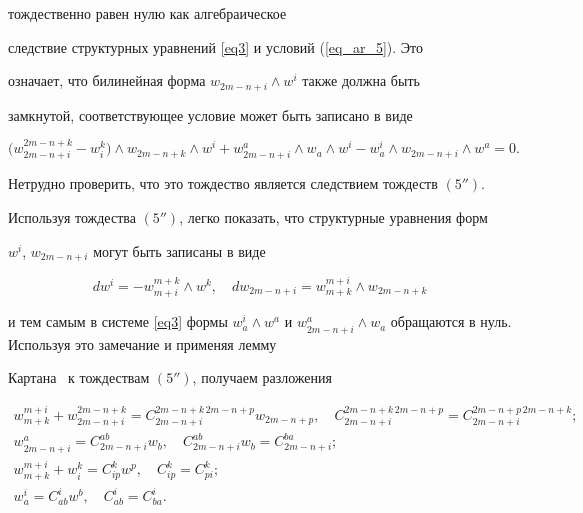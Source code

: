 тождественно равен нулю как алгебраическое


следствие структурных уравнений \eqref{eq3} и условий (\ref{eq_ar_5}). Это


означает, что билинейная форма $w_{2m-n+i}\wedge w^i$ также должна быть


замкнутой, соответствующее условие может быть записано в виде


$$


\big(w^{2m-n+k}_{2m-n+i}-w^k_i\big)\wedge w_{2m-n+k}\wedge w^i


+w^a_{2m-n+i}\wedge w_a\wedge w^i -w^i_a\wedge w_{2m-n+i} \wedge w^a=0.


$$


Нетрудно проверить, что это тождество является следствием тождеств $(5'')$.





Используя тождества $(5'')$, легко показать, что структурные уравнения форм


$w^i$, $w_{2m-n+i}$ могут быть записаны в виде


$$


dw^i=-w^{m+k}_{m+i}\wedge w^k,\quad dw_{2m-n+i}=w^{m+i}_{m+k} \wedge


w_{2m-n+k}


$$


и тем самым в системе \eqref{eq3} формы $w^i_a\wedge w^a$ и $w^a_{2m-n+i} \wedge


w_a$ обращаются в нуль. Используя это замечание и применяя лемму


Картана~\cite{ar5} к тождествам $(5'')$, получаем разложения


\begin{equation}


\label{eq_ar_7}


\begin{array}{c}


w^{m+i}_{m+k}+w^{2m-n+k}_{2m-n+i}=C^{2m-n+k\, 2m-n+p}_{2m-


n+i}w_{2m-n+p},\quad C^{2m-n+k\, 2m-n+p}_{2m-n+i}=C^{2m-n+p\, 2m-n+k}_{2m-


n+i};\\[2mm]


w^a_{2m-n+i}=C^{ab}_{2m-n+i}w_b,\quad C^{ab}_{2m-


n+i}w_b=C^{ba}_{2m-n+i};\\[2mm]


w^{m+i}_{m+k}+w^k_i=C^k_{ip}w^p,\quad C^k_{ip}=C^k_{pi};\\[2mm]


w^i_a=C^i_{ab}w^b,\quad C^i_{ab}=C^i_{ba}.


\end{array}


\end{equation}


